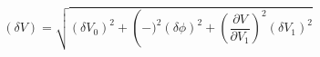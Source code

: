 \begin{equation}
\label{eq:delta_V_Malus}
\left(\delta V\right) = \sqrt{ (\delta V_0)^2 + \left(-)^2 (\delta \phi)^2 + \left( \frac{\partial{V}}{\partial{V_1}}\right)^2 (\delta V_1)^2}
\end{equation}
